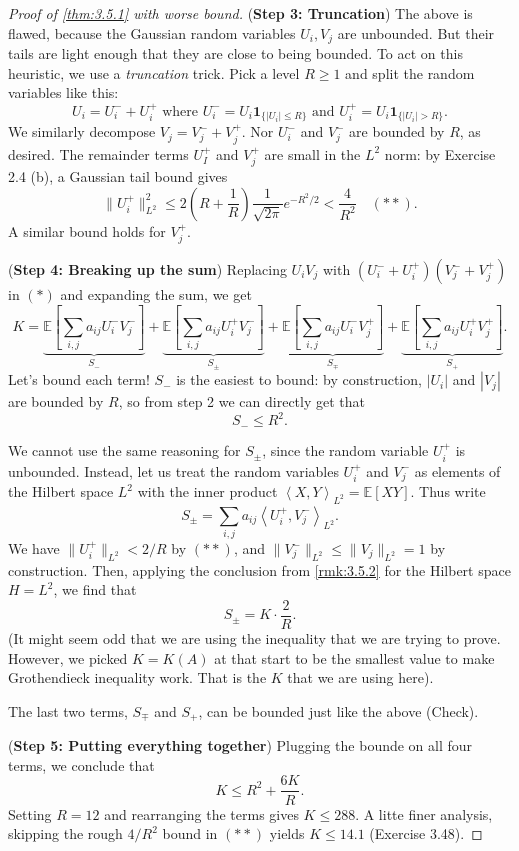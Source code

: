 \begin{proof}[Proof of \cref{thm:3.5.1} with worse bound]
(\textbf{Step 3: Truncation}) The above is flawed, because the Gaussian random variables $U_i, V_j$ are 
unbounded. But their tails are light enough that they are close to being bounded. To act on this heuristic, we 
use a \textit{truncation} trick. Pick a level $R \geq 1$ and split the random variables like this:
\[ U_i = U_i^- + U_i^+ \text{ where } U_i^- = U_i \mathbf{1}_{\{|U_i| \leq R\}} \text{ and } 
U_i^+ = U_i \mathbf{1}_{\{|U_i| > R\}}. \]
We similarly decompose $V_j = V_j^- + V_j^+$. Nor $U_i^-$ and $V_j^-$ are bounded by $R$, as desired. The 
remainder terms $U_I^+$ and $V_j^+$ are small in the $L^2$ norm: by Exercise 2.4 (b), a Gaussian tail bound 
gives 
\[ \lVert U_i^+ \rVert_{L^2}^2 \leq 2 \left( R + \frac{1}{R} \right) \frac{1}{\sqrt{2 \pi}}e^{-R^2 / 2} 
< \frac{4}{R^2} \quad (**). \]
A similar bound holds for $V_j^+$.

(\textbf{Step 4: Breaking up the sum}) Replacing $U_i V_j$ with $(U_i^- + U_i^+)(V_j^- + V_j^+)$ in $(*)$ and 
expanding the sum, we get 
\[ K = \underbrace{\mathbb{E}\left[ \sum_{i, j}^{} a_{ij} U_i^- V_j^- \right]}_{S_-}
+ \underbrace{\mathbb{E}\left[ \sum_{i, j}^{} a_{ij} U_i^+ V_j^- \right]}_{S_{\pm}}
+ \underbrace{\mathbb{E}\left[ \sum_{i, j}^{} a_{ij} U_i^- V_j^+ \right]}_{S_{\mp}} 
+ \underbrace{\mathbb{E}\left[ \sum_{i, j}^{} a_{ij} U_i^+ V_j^+ \right]}_{S_+}. \]
Let's bound each term! $S_-$ is the easiest to bound: by construction, $|U_i|$ and $|V_j|$ are bounded by $R$, 
so from step 2 we can directly get that 
\[ S_- \leq R^2. \]

We cannot use the same reasoning for $S_{\pm}$, since the random variable $U_i^+$ is unbounded. Instead, let 
us treat the random variables $U_i^+$ and $V_j^-$ as elements of the Hilbert space $L^2$ with the inner product 
$\left\langle X, Y \right\rangle_{L^2} = \mathbb{E}\left[ XY \right]$. Thus write 
\[ S_{\pm} = \sum_{i, j}^{} a_{ij} \left\langle U_i^+, V_j^- \right\rangle_{L^2}. \]
We have $\lVert U_i^+ \rVert_{L^2} < 2/R$ by $(**)$, and $\lVert V_j^- \rVert_{L^2} \leq 
\lVert V_j \rVert_{L^2} = 1$ by construction. Then, applying the conclusion from \cref{rmk:3.5.2} for the 
Hilbert space $H = L^2$, we find that 
\[ S_{\pm} = K \cdot \frac{2}{R}. \]
(It might seem odd that we are using the inequality that we are trying to prove. However, we picked 
$K = K(A)$ at that start to be the smallest value to make Grothendieck inequality work. That is the $K$ that 
we are using here).

The last two terms, $S_{\mp}$ and $S_+$, can be bounded just like the above (Check).

(\textbf{Step 5: Putting everything together}) Plugging the bounde on all four terms, we conclude that 
\[ K \leq R^2 + \frac{6K}{R}. \]
Setting $R = 12$ and rearranging the terms gives $K \leq 288$. A litte finer analysis, skipping the rough 
$4 / R^2$ bound in $(**)$ yields $K \leq 14.1$ (Exercise 3.48).
\end{proof}

